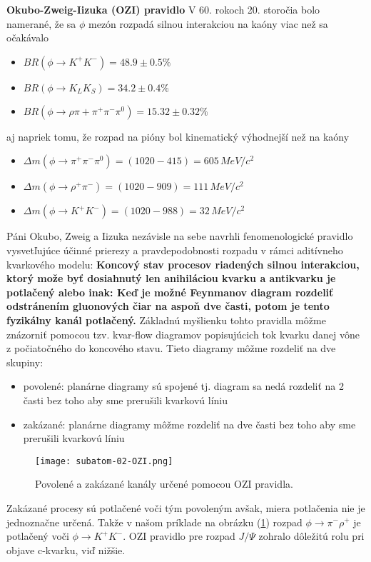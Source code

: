 \documentclass[../../main.tex]{subfiles}
\begin{document}
\textbf{Okubo-Zweig-Iizuka (OZI) pravidlo}\newline
V 60. rokoch 20. storočia bolo namerané, že sa $\phi$ mezón rozpadá silnou interakciou na kaóny viac než sa očakávalo
\begin{itemize}
\item $BR(\phi \rightarrow K^+K^-) = 48.9 \pm 0.5 \%$
\item $BR(\phi \rightarrow K_LK_S) = 34.2 \pm 0.4 \%$
\item $BR(\phi \rightarrow \rho \pi+\pi^+ \pi^- \pi^0) = 15.32 \pm 0.32 \%$
\end{itemize}
aj napriek tomu, že rozpad na pióny bol kinematický výhodnejší než na kaóny
\begin{itemize}
\item $\Delta m(\phi \rightarrow \pi^{+} \pi^{-} \pi^{0})= (1020-415) = 605\,MeV/c^{2}$
\item $\Delta m(\phi \rightarrow \rho^{+} \pi^{-})= (1020-909) = 111\,MeV/c^2$
\item $\Delta m(\phi \rightarrow K^{+} K^{-})= (1020-988) = 32\,MeV/c^2$
\end{itemize}
Páni Okubo, Zweig a Iizuka nezávisle na sebe navrhli fenomenologické pravidlo vysvetľujúce účinné prierezy a pravdepodobnosti rozpadu v rámci aditívneho kvarkového modelu: \textbf{Koncový stav procesov riadených silnou interakciou, ktorý može byť dosiahnutý len anihiláciou kvarku a antikvarku je potlačený alebo inak: Keď je možné Feynmanov diagram rozdeliť odstránením gluonových čiar na aspoň dve časti, potom je tento fyzikálny kanál potlačený.}
Základnú myšlienku tohto pravidla môžme znázorniť pomocou tzv. kvar-flow diagramov popisujúcich tok kvarku danej vône z počiatočného do koncového stavu. Tieto diagramy môžme rozdeliť na dve skupiny:
\begin{itemize}
\item povolené: planárne diagramy sú spojené tj. diagram sa nedá rozdeliť na 2 časti bez toho aby sme prerušili kvarkovú líniu
\item zakázané: planárne diagramy môžme rozdeliť na dve časti bez toho aby sme prerušili kvarkovú líniu
\end{itemize}

\begin{figure}[!h]
\texttt{[image: subatom-02-OZI.png]}
\centering
\caption{Povolené a zakázané kanály určené pomocou OZI pravidla.}
\label{sf2:fig:OZI}
\end{figure}

Zakázané procesy sú potlačené voči tým povoleným avšak, miera potlačenia nie je jednoznačne určená. Takže v našom príklade na obrázku (\ref{sf2:fig:OZI}) rozpad $\phi \rightarrow \pi^{-} \rho^{+}$ je potlačený voči $\phi \rightarrow K^{+} K^{-}$. OZI pravidlo pre rozpad $J/\Psi$ zohralo dôležitú rolu pri objave c-kvarku, viď nižšie.\newline
\end{document}
